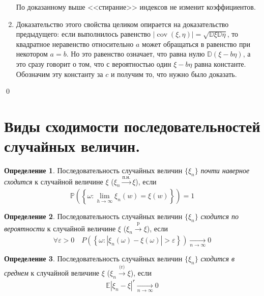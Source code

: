 \documentclass[oneside,final,14pt]{extreport}
\renewenvironment{proof}{{\bfseries Доказательство.}}{\qed}
\theoremstyle{definition}
\newtheorem{defn}{Определение}[section]
\begin{document}
\begin{proof}
\begin{enumerate}
    По доказанному выше <<стирание>> индексов не изменит коэффициентов.

    \item Доказательство этого свойства целиком опирается на доказательство предыдущего: если выполнилось равенство $|\operatorname{cov}(\xi, \eta)|=\sqrt{\mathbb{D} \xi \mathbb{D} \eta}$, то квадратное неравенство относительно $a$ может обращаться в равенство при некотором $a = b$. Но это равенство означает, что равна нулю $\mathbb{D}(\xi-b \eta)$, а это сразу говорит о том, что с вероятностью один $\xi - b\eta$ равна константе. Обозначим эту константу за $c$ и получим то, что нужно было доказать.

\end{enumerate}
\end{proof}

\section{Виды сходимости последовательностей случайных величин.}
\begin{defn}
    Последовательность случайных величин $\{\xi_n\}$ {\it почти наверное сходится} к случайной величине $\xi$ ($\xi_n \xrightarrow[]{\text{п.н.}} \xi$), если
    \begin{equation*}
        \mathbb{P}\left(\left\{\omega: \lim\limits _{h \rightarrow \infty} \xi_{n}(w)=\xi(w)\right\}\right)=1
    \end{equation*}
\end{defn}

\begin{defn}
    Последовательность случайных величин $\{\xi_n\}$ {\it сходится по вероятности} к случайной величине $\xi$ ($\xi_n \xrightarrow[]{\text{p}} \xi$), если
    \begin{equation*}
        \forall \varepsilon>0 \quad P\left(\left\{\omega: |\xi_{n}(\omega)-\xi(\omega)|>\varepsilon\right\}\right) \xrightarrow[n \to \infty]{} 0
    \end{equation*}
\end{defn}

\begin{defn}
    Последовательность случайных величин $\{\xi_n\}$ {\it сходится в среднем} к случайной величине $\xi$ ($\xi_n \xrightarrow[]{\text{(r)}} \xi$), если
    \begin{equation*}
        \mathbb{E}\left|\xi_{n}-\xi\right|^{r} \xrightarrow[n \to \infty]{} 0
    \end{equation*}
\end{defn}
\end{document}
